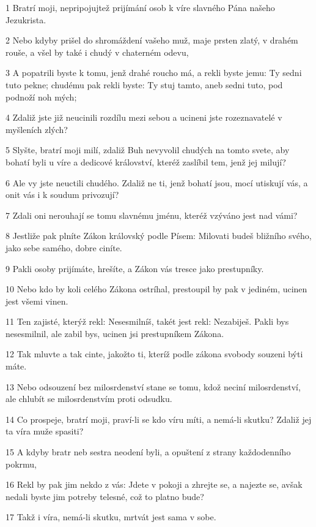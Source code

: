 \par 1 Bratrí moji, nepripojujtež prijímání osob k víre slavného Pána našeho Jezukrista.
\par 2 Nebo kdyby prišel do shromáždení vašeho muž, maje prsten zlatý, v drahém rouše, a všel by také i chudý v chaterném odevu,
\par 3 A popatrili byste k tomu, jenž drahé roucho má, a rekli byste jemu: Ty sedni tuto pekne; chudému pak rekli byste: Ty stuj tamto, aneb sedni tuto, pod podnoží noh mých;
\par 4 Zdaliž jste již neucinili rozdílu mezi sebou a ucineni jste rozeznavatelé v myšleních zlých?
\par 5 Slyšte, bratrí moji milí, zdaliž Buh nevyvolil chudých na tomto svete, aby bohatí byli u víre a dedicové království, kteréž zaslíbil tem, jenž jej milují?
\par 6 Ale vy jste neuctili chudého. Zdaliž ne ti, jenž bohatí jsou, mocí utiskují vás, a onit vás i k soudum privozují?
\par 7 Zdali oni nerouhají se tomu slavnému jménu, kteréž vzýváno jest nad vámi?
\par 8 Jestliže pak plníte Zákon královský podle Písem: Milovati budeš bližního svého, jako sebe samého, dobre ciníte.
\par 9 Pakli osoby prijímáte, hrešíte, a Zákon vás tresce jako prestupníky.
\par 10 Nebo kdo by koli celého Zákona ostríhal, prestoupil by pak v jediném, ucinen jest všemi vinen.
\par 11 Ten zajisté, kterýž rekl: Nesesmilníš, takét jest rekl: Nezabiješ. Pakli bys nesesmilnil, ale zabil bys, ucinen jsi prestupníkem Zákona.
\par 12 Tak mluvte a tak cinte, jakožto ti, kteríž podle zákona svobody souzeni býti máte.
\par 13 Nebo odsouzení bez milosrdenství stane se tomu, kdož neciní milosrdenství, ale chlubít se milosrdenstvím proti odsudku.
\par 14 Co prospeje, bratrí moji, praví-li se kdo víru míti, a nemá-li skutku? Zdaliž jej ta víra muže spasiti?
\par 15 A kdyby bratr neb sestra neodení byli, a opuštení z strany každodenního pokrmu,
\par 16 Rekl by pak jim nekdo z vás: Jdete v pokoji a zhrejte se, a najezte se, avšak nedali byste jim potreby telesné, což to platno bude?
\par 17 Takž i víra, nemá-li skutku, mrtvát jest sama v sobe.
